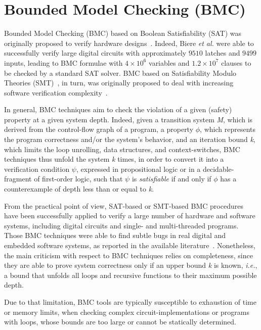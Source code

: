 \documentclass{acm_sen_article}
\begin{document}
\section{Bounded Model Checking (BMC)}

Bounded Model Checking (BMC) based on Boolean Satisfiability (SAT) was originally proposed to verify hardware designs~\cite{Biere99,handbook09}. Indeed, Biere {\it et al.} were able to successfully verify large digital circuits with approximately $9510$ latches and $9499$ inputs, leading to BMC formulae with $4 \times 10^6$ variables and $1.2 \times 10^7$ clauses to be checked by a standard SAT solver. BMC based on Satisfiability Modulo Theories (SMT)~\cite{BarrettSST09}, in turn, was originally proposed to deal with increasing software verification complexity~\cite{Armando06}. 

In general, BMC techniques aim to check the violation of a given (safety) property at a given system depth. Indeed, given a transition system \textit{M}, which is derived from the control-flow graph of a program, a property $\phi$, which represents the program correctness and/or the system's behavior, and an iteration bound \textit{k}, which limits the loop unrolling, data structures, and context-switches, BMC techniques thus unfold the system \textit{k} times, in order to convert it into a verification condition $\psi$, expressed in propositional logic or in a decidable-fragment of first-order logic, such that $\psi$ is \textit{satisfiable} if and only if $\phi$ has a counterexample of depth less than or equal to \textit{k}.

From the practical point of view, SAT-based or SMT-based BMC procedures have been successfully applied to verify a large number of hardware and software systems, including digital circuits and single- and multi-threaded programs. Those BMC techniques were able to find subtle bugs in real digital and embedded software systems, as reported in the available literature~\cite{Clarke04,MerzFS12,CordeiroF11,Ivancic05,Cordeiro12}. Nonetheless, the main criticism with respect to BMC techniques relies on completeness, since they are able to prove system correctness only if an upper bound \textit{k} is known, {\it i.e.}, a bound that unfolds all loops and recursive functions to their maximum possible depth. 

Due to that limitation, BMC tools are typically susceptible to exhaustion of time or memory limits, when checking complex circuit-implementations or programs with loops, whose bounds are too large or cannot be statically determined.  
\end{document}
